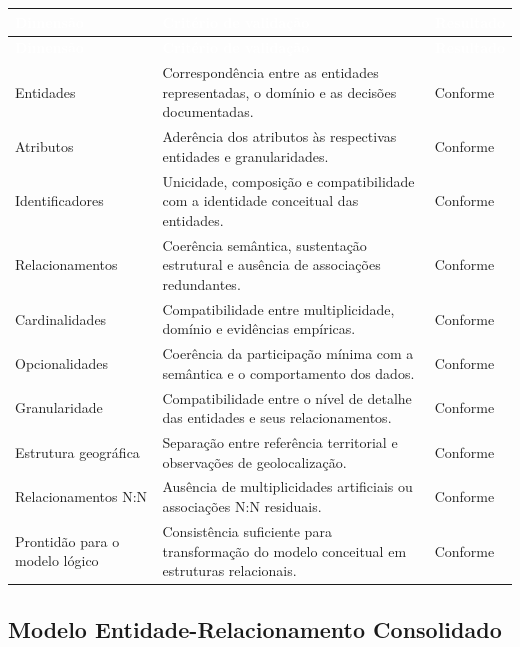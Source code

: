 \documentclass[12pt,a4paper]{article}
\begin{document}
	{\small
		\renewcommand{\arraystretch}{1.35}
		
		\begin{longtable}{
				|>{\raggedright\arraybackslash}p{3.5cm}
				|>{\raggedright\arraybackslash}p{8cm}
				|>{\centering\arraybackslash}p{2.2cm}|
			}
			\hline
			\rowcolor{AzulCorporativo}
			\textcolor{white}{\textbf{Dimensão}} &
			\textcolor{white}{\textbf{Critério de validação}} &
			\textcolor{white}{\textbf{Resultado}} \\ \hline
			\endfirsthead
			
			\hline
			\rowcolor{AzulCorporativo}
			\textcolor{white}{\textbf{Dimensão}} &
			\textcolor{white}{\textbf{Critério de validação}} &
			\textcolor{white}{\textbf{Resultado}} \\ \hline
			\endhead
			
			Entidades & Correspondência entre as entidades representadas, o domínio e as decisões documentadas. & Conforme \\ \hline
			Atributos & Aderência dos atributos às respectivas entidades e granularidades. & Conforme \\ \hline
			Identificadores & Unicidade, composição e compatibilidade com a identidade conceitual das entidades. & Conforme \\ \hline
			Relacionamentos & Coerência semântica, sustentação estrutural e ausência de associações redundantes. & Conforme \\ \hline
			Cardinalidades & Compatibilidade entre multiplicidade, domínio e evidências empíricas. & Conforme \\ \hline
			Opcionalidades & Coerência da participação mínima com a semântica e o comportamento dos dados. & Conforme \\ \hline
			Granularidade & Compatibilidade entre o nível de detalhe das entidades e seus relacionamentos. & Conforme \\ \hline
			Estrutura geográfica & Separação entre referência territorial e observações de geolocalização. & Conforme \\ \hline
			Relacionamentos N:N & Ausência de multiplicidades artificiais ou associações N:N residuais. & Conforme \\ \hline
			Prontidão para o modelo lógico & Consistência suficiente para transformação do modelo conceitual em estruturas relacionais. & Conforme \\ \hline
		\end{longtable}
	}
	
	\subsection{Modelo Entidade-Relacionamento Consolidado}
	
\end{document}
